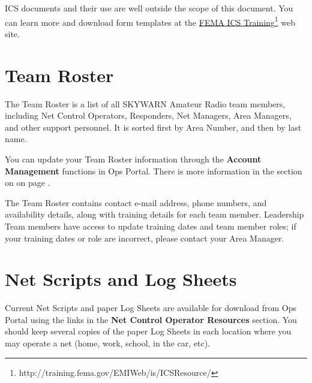 \documentclass[pdflatex,letterpaper,twoside,12pt]{book}
\begin{document}
ICS documents and their use are well outside the scope of this document.  You can learn more and download form templates at the \href{http://training.fema.gov/EMIWeb/is/ICSResource/}{FEMA ICS Training}\footnote{http://training.fema.gov/EMIWeb/is/ICSResource/} web site.


\section{Team Roster}\label{team-roster}

The Team Roster is a list of all SKYWARN Amateur Radio team members, including Net Control Operators, Responders, Net Managers, Area Managers, and other support personnel.  It is sorted first by Area Number, and then by last name.

You can update your Team Roster information through the \textbf{Account Management} functions in Ops Portal.  There is more information in the section on  on page \pageref{profile-update}.

The Team Roster contains contact e-mail address, phone numbers, and availability details, along with training details for each team member.  Leadership Team members have access to update training dates and team member roles;  if your training dates or role are incorrect, please contact your Area Manager.



\section{Net Scripts and Log Sheets}

Current Net Scripts and paper Log Sheets are available for download from Ops Portal using the links in the \textbf{Net Control Operator Resources} section.  You should keep several copies of the paper Log Sheets in each location where you may operate a net (home, work, school, in the car, etc).
\end{document}
